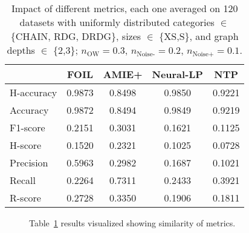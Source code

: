 \documentclass[letterpaper]{article} \usepackage{aaai20}  \usepackage{times}  \usepackage{helvet} \usepackage{courier}  \usepackage[hyphens]{url}  \usepackage{graphicx} \urlstyle{rm} \def\UrlFont{\rm}  \usepackage{graphicx}  \frenchspacing  \setlength{\pdfpagewidth}{8.5in}  \setlength{\pdfpageheight}{11in}  \usepackage{amsthm}
\theoremstyle{definition}
\newcommand{\nowa}{\ensuremath{n_{\text{OW}}}\xspace}
\newcommand{\nnoiseadd}{\ensuremath{n_{\text{Noise+}}}\xspace}
\newcommand{\nnoisemiss}{\ensuremath{n_{\text{Noise-}}}\xspace}
\begin{document}
\begin{table}[h!]
    \centering
\begin{tabular}{lcccc}
    \toprule
    & FOIL & AMIE+ & Neural-LP & NTP \\
     \midrule
    H-accuracy & 0.9873 &	0.8498 & 	0.9850 &	0.9221 \\
    Accuracy & 0.9872 &	0.8494 &	0.9849 &	0.9219\\
    F1-score &  0.2151 &	0.3031 &	0.1621 & 	0.1125 \\
    H-score & 0.1520 &	0.2321 &	0.1025 &	0.0728 \\
    Precision & 0.5963 &	0.2982 &	0.1687 &	0.1021 \\ Recall & 0.2264 &	0.7311 &	0.2433 &	0.3921 \\
    R-score & 0.2728 &	0.3350  & 0.1906 & 0.1811 \\
    \bottomrule
    \end{tabular}
    \caption{Impact of different metrics, each one averaged on 120 datasets with uniformly distributed categories $\in$ \{CHAIN, RDG, DRDG\}, sizes $\in$ \{XS,S\}, and graph depths $\in$ \{2,3\}; $\nowa=0.3$, $\nnoisemiss=0.2$, $\nnoiseadd=0.1$.}
    \label{tab:result_1}
\end{table}

\begin{figure}
\centering
{}
\caption{Table~\ref{tab:result_1} results visualized showing  similarity of metrics.
}
\label{fig:measures}
\end{figure}
\end{document}
